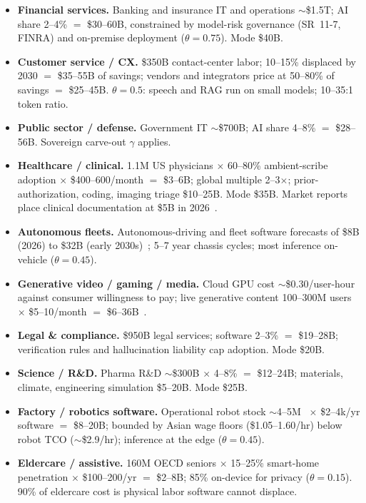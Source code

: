 \documentclass[11pt,letterpaper]{article}
\begin{document}
\begin{itemize}
    \item \textbf{Financial services.} Banking and insurance IT and operations $\sim$\$1.5T; AI share 2--4\% $=$ \$30--60B, constrained by model-risk governance (SR~11-7, FINRA) and on-premise deployment ($\theta=0.75$). Mode \$40B.
    \item \textbf{Customer service / CX.} \$350B contact-center labor; 10--15\% displaced by 2030 $=$ \$35--55B of savings; vendors and integrators price at 50--80\% of savings $=$ \$25--45B. $\theta=0.5$: speech and RAG run on small models; 10--35:1 token ratio.
    \item \textbf{Public sector / defense.} Government IT $\sim$\$700B; AI share 4--8\% $=$ \$28--56B. Sovereign carve-out $\gamma$ applies.
    \item \textbf{Healthcare / clinical.} 1.1M US physicians $\times$ 60--80\% ambient-scribe adoption $\times$ \$400--600/month $=$ \$3--6B; global multiple 2--3$\times$; prior-authorization, coding, imaging triage \$10--25B. Mode \$35B. Market reports place clinical documentation at \$5B in 2026~\cite{ref:healthcare_rm}.
    \item \textbf{Autonomous fleets.} Autonomous-driving and fleet software forecasts of \$8B (2026) to \$32B (early 2030s)~\cite{ref:av_fbi}; 5--7 year chassis cycles; most inference on-vehicle ($\theta=0.45$).
    \item \textbf{Generative video / gaming / media.} Cloud GPU cost $\sim$\$0.30/user-hour against consumer willingness to pay; live generative content 100--300M users $\times$ \$5--10/month $=$ \$6--36B~\cite{ref:newzoo}.
    \item \textbf{Legal \& compliance.} \$950B legal services; software 2--3\% $=$ \$19--28B; verification rules and hallucination liability cap adoption. Mode \$20B.
    \item \textbf{Science / R\&D.} Pharma R\&D $\sim$\$300B $\times$ 4--8\% $=$ \$12--24B; materials, climate, engineering simulation \$5--20B. Mode \$25B.
    \item \textbf{Factory / robotics software.} Operational robot stock $\sim$4--5M~\cite{ref:ifr} $\times$ \$2--4k/yr software $=$ \$8--20B; bounded by Asian wage floors (\$1.05--1.60/hr) below robot TCO ($\sim$\$2.9/hr); inference at the edge ($\theta=0.45$).
    \item \textbf{Eldercare / assistive.} 160M OECD seniors $\times$ 15--25\% smart-home penetration $\times$ \$100--200/yr $=$ \$2--8B; 85\% on-device for privacy ($\theta=0.15$). 90\% of eldercare cost is physical labor software cannot displace.

\end{itemize}
\end{document}
